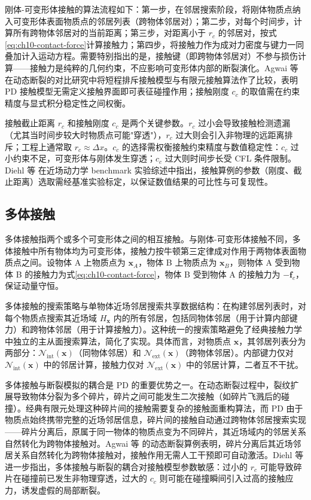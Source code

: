刚体-可变形体接触的算法流程如下：第一步，在邻居搜索阶段，将刚体物质点纳入可变形体表面物质点的邻居列表（跨物体邻居对）；第二步，对每个时间步，计算所有跨物体邻居对的当前距离；第三步，对距离小于 $r_{c}$ 的邻居对，按式\eqref{eq:ch10-contact-force}计算接触力；第四步，将接触力作为成对力密度与键力一同叠加计入运动方程。需要特别指出的是，接触键（即跨物体邻居对）不参与损伤计算——接触力是纯粹的几何约束，不应影响可变形体内部的断裂演化。Agwai 等 \cite{Agwai2011} 在动态断裂的对比研究中将短程排斥接触模型与有限元接触算法作了比较，表明 PD 接触模型无需定义接触界面即可表征碰撞作用；接触刚度 $c_{c}$ 的取值需在约束精度与显式积分稳定性之间权衡。

接触截止距离 $r_{c}$ 和接触刚度 $c_{c}$ 是两个关键参数。$r_{c}$ 过小会导致接触检测遗漏（尤其当时间步较大时物质点可能"穿透"），$r_{c}$ 过大则会引入非物理的远距离排斥；工程上通常取 $r_{c}\approx\Delta x$。$c_{c}$ 的选择需权衡接触约束精度与数值稳定性：$c_{c}$ 过小约束不足，可变形体与刚体发生穿透；$c_{c}$ 过大则时间步长受 CFL 条件限制。Diehl 等 \cite{Diehl2019} 在近场动力学 benchmark 实验综述中指出，接触算例的参数（刚度、截止距离）选取需经基准实验标定，以保证数值结果的可比性与可复现性。

\subsection{多体接触}

多体接触指两个或多个可变形体之间的相互接触。与刚体-可变形体接触不同，多体接触中所有物体均为可变形体，接触力按牛顿第三定律成对作用于两物体表面物质点之间。设物体 A 上物质点为 $\mathbf{x}_{A}$，物体 B 上物质点为 $\mathbf{x}_{B}$，则物体 A 受到物体 B 的接触力为式\eqref{eq:ch10-contact-force}，物体 B 受到物体 A 的接触力为 $-\mathbf{f}_{c}$，保证动量守恒。

多体接触的搜索策略与单物体近场邻居搜索共享数据结构：在构建邻居列表时，对每个物质点搜索其近场域 $H_{\mathbf{x}}$ 内的所有邻居，包括同物体邻居（用于计算内部键力）和跨物体邻居（用于计算接触力）。这种统一的搜索策略避免了经典接触力学中独立的主从面搜索算法，简化了实现。具体而言，对物质点 $\mathbf{x}$，其邻居列表分为两部分：$\mathcal{N}_{\text{int}}(\mathbf{x})$（同物体邻居）和 $\mathcal{N}_{\text{ext}}(\mathbf{x})$（跨物体邻居）。内部键力仅对 $\mathcal{N}_{\text{int}}(\mathbf{x})$ 中的邻居计算，接触力仅对 $\mathcal{N}_{\text{ext}}(\mathbf{x})$ 中的邻居计算，二者互不干扰。

多体接触与断裂模拟的耦合是 PD 的重要优势之一。在动态断裂过程中，裂纹扩展导致物体分裂为多个碎片，碎片之间可能发生二次接触（如碎片飞溅后的碰撞）。经典有限元处理这种碎片间的接触需要复杂的接触面重构算法，而 PD 由于物质点始终携带完整的近场邻居信息，碎片间的接触自动通过跨物体邻居搜索实现——碎片分离后，原属于同一物体的物质点变为不同碎片，其近场域内的邻居关系自然转化为跨物体接触对。Agwai 等 \cite{Agwai2011} 的动态断裂算例表明，碎片分离后其近场邻居关系自然转化为跨物体接触对，接触作用无需人工干预即可自动激活。Diehl 等 \cite{Diehl2019} 进一步指出，多体接触与断裂的耦合对接触模型参数敏感：过小的 $r_{c}$ 可能导致碎片在碰撞前已发生非物理穿透，过大的 $c_{c}$ 则可能在碰撞瞬间引入过高的接触应力，诱发虚假的局部断裂。

